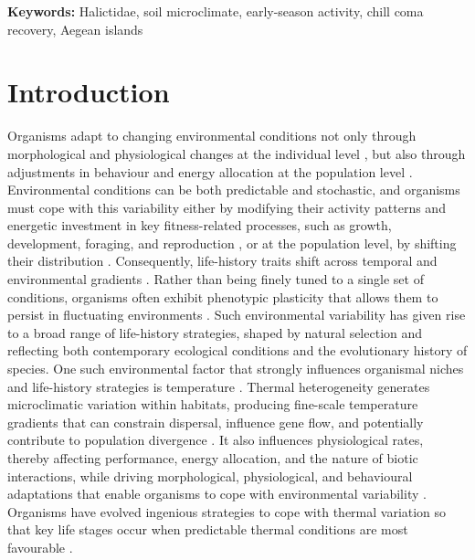 \documentclass[11pt,a4paper]{article}
\begin{document}
\vspace{1em}

\noindent\textbf{Keywords:}
Halictidae, soil microclimate, early-season activity, chill coma recovery, Aegean islands

\newpage

\section{Introduction}

Organisms adapt to changing environmental conditions not only through morphological and physiological changes at the individual level \citep{rodrigues2020thermal, gonzalez2020insect}, but also through adjustments in behaviour and energy allocation at the population level \citep{Gould1978, stollewerk2025plasticity}. Environmental conditions can be both predictable and stochastic, and organisms must cope with this variability either by modifying their activity patterns and energetic investment in key fitness-related processes, such as growth, development, foraging, and reproduction \citep{Eliopoulos2003, Whitfield1992}, or at the population level, by shifting their distribution \citep{Lomolino2017, Huang2022, Davis2001}. Consequently, life-history traits shift across temporal and environmental gradients \citep{Stearns1976}. Rather than being finely tuned to a single set of conditions, organisms often exhibit phenotypic plasticity that allows them to persist in fluctuating environments \citep{Burton2022}. Such environmental variability has given rise to a broad range of life-history strategies, shaped by natural selection and reflecting both contemporary ecological conditions and the evolutionary history of species. One such environmental factor that strongly influences organismal niches and life-history strategies is temperature \citep{Truebano2018, Gilbert1996, Howe1967, Kamm1974, Melville2001, Porter1988}. Thermal heterogeneity generates microclimatic variation within habitats, producing fine-scale temperature gradients that can constrain dispersal, influence gene flow, and potentially contribute to population divergence \citep{Johansson2016}. It also influences physiological rates, thereby affecting performance, energy allocation, and the nature of biotic interactions, while driving morphological, physiological, and behavioural adaptations that enable organisms to cope with environmental variability \citep{Tattersall2012, Kingsolver1998, Abram2017}. Organisms have evolved ingenious strategies to cope with thermal variation so that key life stages occur when predictable thermal conditions are most favourable \citep{Forrest2010}. 
\end{document}
